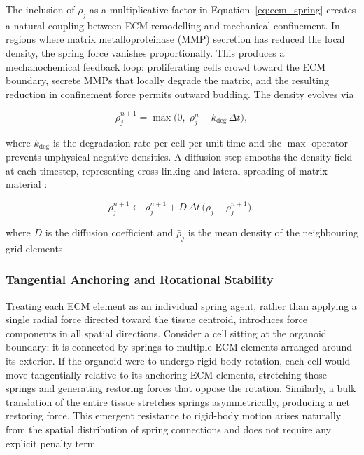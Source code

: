 The inclusion of $\rho_j$ as a multiplicative factor in Equation~\eqref{eq:ecm_spring} creates a natural coupling between ECM remodelling and mechanical confinement.
In regions where matrix metalloproteinase (MMP) secretion has reduced the local density, the spring force vanishes proportionally.
This produces a mechanochemical feedback loop: proliferating cells crowd toward the ECM boundary, secrete MMPs that locally degrade the matrix, and the resulting reduction in confinement force permits outward budding.
The density evolves via

\begin{equation}
    \rho_j^{n+1} = \max\!\bigl(0,\;\rho_j^n - k_{\text{deg}}\,\Delta t\bigr),
    \label{eq:ecm_degradation}
\end{equation}

\noindent where $k_{\text{deg}}$ is the degradation rate per cell per unit time and the $\max$ operator prevents unphysical negative densities.
A diffusion step smooths the density field at each timestep, representing cross-linking and lateral spreading of matrix material \cite{Lu2011}:

\begin{equation}
    \rho_j^{n+1} \leftarrow \rho_j^{n+1} + D\,\Delta t\,\bigl(\bar{\rho}_j - \rho_j^{n+1}\bigr),
    \label{eq:ecm_diffusion}
\end{equation}

\noindent where $D$ is the diffusion coefficient and $\bar{\rho}_j$ is the mean density of the neighbouring grid elements.

\subsubsection{Tangential Anchoring and Rotational Stability}

Treating each ECM element as an individual spring agent, rather than applying a single radial force directed toward the tissue centroid, introduces force components in all spatial directions.
Consider a cell sitting at the organoid boundary: it is connected by springs to multiple ECM elements arranged around its exterior.
If the organoid were to undergo rigid-body rotation, each cell would move tangentially relative to its anchoring ECM elements, stretching those springs and generating restoring forces that oppose the rotation.
Similarly, a bulk translation of the entire tissue stretches springs asymmetrically, producing a net restoring force.
This emergent resistance to rigid-body motion arises naturally from the spatial distribution of spring connections and does not require any explicit penalty term.

